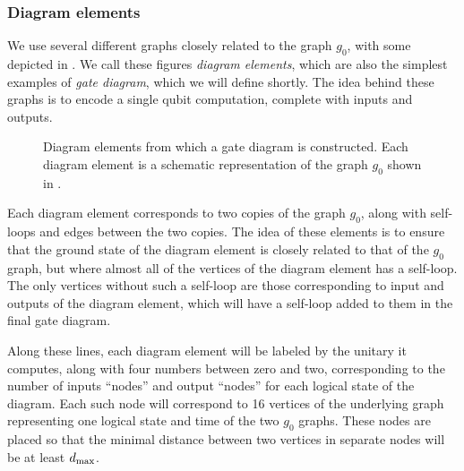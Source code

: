 \documentclass[../thesis-main/thesis-main]{subfiles}
\begin{document}
\subsubsection{Diagram elements}\label{sec:diagram_elements}

We use several different graphs closely related to the graph $g_0$, with some depicted in .  We call these figures \emph{diagram elements}, which are also the simplest examples of \emph{gate diagram}, which we will define shortly.  The idea behind these graphs is to encode a single qubit computation, complete with inputs and outputs. 


\begin{figure}
\centering
\qquad
{} 
\qquad 
{}
\caption[Diagram elements]{Diagram elements from which a gate diagram is constructed. Each diagram element is a schematic representation of the graph $g_{0}$ shown
in . 
\label{fig:diagram_elements}}
\end{figure}

Each diagram element corresponds to two copies of the graph $g_0$, along with self-loops and edges between the two copies.  The idea of these elements is to ensure that the ground state of the diagram element is closely related to that of the $g_0$ graph, but where almost all of the vertices of the diagram element has a self-loop.  The only vertices without such a self-loop are those corresponding to input and outputs of the diagram element, which will have a self-loop added to them in the final gate diagram.


Along these lines, each diagram element will be labeled by the unitary it computes, along with four numbers between zero and two, corresponding to the number of inputs ``nodes'' and output ``nodes'' for each logical state of the diagram.  Each such node will correspond to 16 vertices of the underlying graph representing one logical state and time of the two $g_0$ graphs.  These nodes are placed so that the minimal distance between two vertices in separate nodes will be at least $d_{\text{max}}$.  
\end{document}
